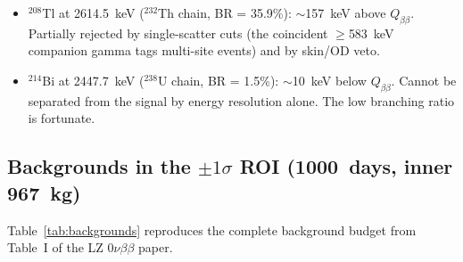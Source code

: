 \documentclass[11pt]{article}
\begin{document}
\begin{itemize}
\item $^{208}$Tl at 2614.5~keV ($^{232}$Th chain, BR = 35.9\%):
  $\sim$157~keV above $Q_{\beta\beta}$.  Partially rejected by
  single-scatter cuts (the coincident $\geq$583~keV companion gamma
  tags multi-site events) and by skin/OD veto.

\item $^{214}$Bi at 2447.7~keV ($^{238}$U chain, BR = 1.5\%):
  $\sim$10~keV below $Q_{\beta\beta}$.  Cannot be separated from the
  signal by energy resolution alone.  The low branching ratio is
  fortunate.
\end{itemize}

\subsection{Backgrounds in the $\pm 1\sigma$ ROI (1000~days, inner 967~kg)}

Table~\ref{tab:backgrounds} reproduces the complete background budget
from Table~I of the LZ $0\nu\beta\beta$ paper.
\end{document}
